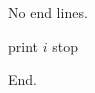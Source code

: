 \documentclass{article}
\begin{document}
No end lines.

\begin{algorithm}[h]
\caption{Without end}
\begin{algorithmic}[1]
\STATE print $i$
\ENDIF
\ENDFOR
\STATE stop
\end{algorithmic}
\end{algorithm}

End.
\end{document}
